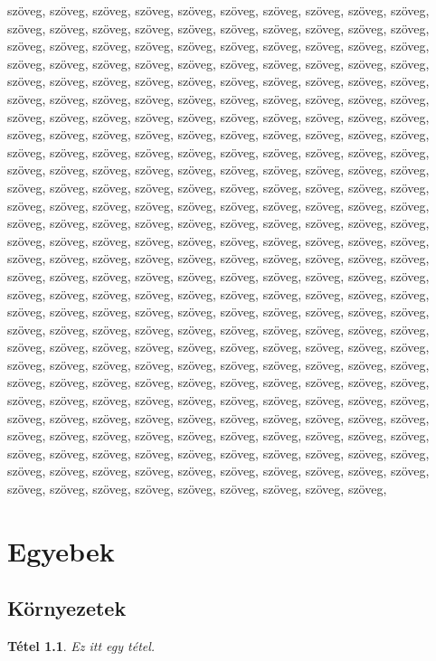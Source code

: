 \documentclass[12pt]{report}
\newtheorem{tét}{Tétel}[chapter]
\theoremstyle{definition}
\begin{document}
szöveg, szöveg, szöveg, szöveg, szöveg, szöveg, szöveg, szöveg, szöveg, szöveg, szöveg, szöveg, szöveg, szöveg, szöveg,
szöveg, szöveg, szöveg, szöveg, szöveg, szöveg, szöveg, szöveg, szöveg, szöveg, szöveg, szöveg, szöveg, szöveg, szöveg,
szöveg, szöveg, szöveg, szöveg, szöveg, szöveg, szöveg, szöveg, szöveg, szöveg, szöveg, szöveg, szöveg, szöveg, szöveg,
szöveg, szöveg, szöveg, szöveg, szöveg, szöveg, szöveg, szöveg, szöveg, szöveg, szöveg, szöveg, szöveg, szöveg, szöveg,
szöveg, szöveg, szöveg,  szöveg, szöveg, szöveg, szöveg, szöveg, szöveg, szöveg, szöveg, szöveg, szöveg, szöveg, szöveg,
szöveg, szöveg, szöveg, szöveg, szöveg, szöveg, szöveg, szöveg, szöveg, szöveg, szöveg, szöveg, szöveg, szöveg, szöveg,
szöveg, szöveg, szöveg, szöveg, szöveg, szöveg, szöveg, szöveg, szöveg, szöveg, szöveg, szöveg,
szöveg, szöveg, szöveg, szöveg, szöveg, szöveg, szöveg, szöveg, szöveg, szöveg, szöveg, szöveg, szöveg, szöveg, szöveg,
szöveg, szöveg, szöveg, szöveg, szöveg, szöveg, szöveg, szöveg, szöveg, szöveg, szöveg, szöveg, szöveg, szöveg, szöveg,
szöveg, szöveg, szöveg, szöveg, szöveg, szöveg, szöveg, szöveg, szöveg, szöveg, szöveg, szöveg, szöveg, szöveg, szöveg,
szöveg, szöveg, szöveg, szöveg, szöveg, szöveg, szöveg, szöveg, szöveg, szöveg, szöveg, szöveg, szöveg, szöveg, szöveg,
szöveg, szöveg, szöveg, szöveg, szöveg, szöveg, szöveg, szöveg, szöveg, szöveg, szöveg, szöveg, szöveg, szöveg, szöveg,
szöveg, szöveg, szöveg, szöveg, szöveg, szöveg, szöveg, szöveg, szöveg, szöveg, szöveg, szöveg, szöveg, szöveg, szöveg,
szöveg, szöveg, szöveg, szöveg, szöveg, szöveg, szöveg, szöveg, szöveg, szöveg, szöveg, szöveg, szöveg, szöveg, szöveg,
szöveg, szöveg, szöveg,  szöveg, szöveg, szöveg, szöveg, szöveg, szöveg, szöveg, szöveg, szöveg, szöveg, szöveg, szöveg,
szöveg, szöveg, szöveg, szöveg, szöveg, szöveg, szöveg, szöveg, szöveg, szöveg, szöveg, szöveg, szöveg, szöveg, szöveg,
szöveg, szöveg, szöveg, szöveg, szöveg, szöveg, szöveg, szöveg, szöveg, szöveg, szöveg, szöveg,
szöveg, szöveg, szöveg, szöveg, szöveg, szöveg, szöveg, szöveg, szöveg, szöveg, szöveg, szöveg, szöveg, szöveg, szöveg,
szöveg, szöveg, szöveg, szöveg, szöveg, szöveg, szöveg, szöveg, szöveg, szöveg, szöveg, szöveg, szöveg, szöveg, szöveg,

\chapter{Egyebek}

\section{Környezetek}
\begin{tét}
\label{tét-alap}
Ez itt egy tétel.
\end{tét}
\end{document}
